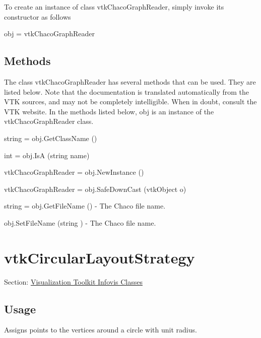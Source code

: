 To create an instance of class vtk\-Chaco\-Graph\-Reader, simply invoke its constructor as follows \begin{DoxyVerb}  obj = vtkChacoGraphReader
\end{DoxyVerb}
 \hypertarget{vtkwidgets_vtkxyplotwidget_Methods}{}\subsection{Methods}\label{vtkwidgets_vtkxyplotwidget_Methods}
The class vtk\-Chaco\-Graph\-Reader has several methods that can be used. They are listed below. Note that the documentation is translated automatically from the V\-T\-K sources, and may not be completely intelligible. When in doubt, consult the V\-T\-K website. In the methods listed below, {\ttfamily obj} is an instance of the vtk\-Chaco\-Graph\-Reader class. 
\begin{DoxyItemize}
\item {\ttfamily string = obj.\-Get\-Class\-Name ()}  
\item {\ttfamily int = obj.\-Is\-A (string name)}  
\item {\ttfamily vtk\-Chaco\-Graph\-Reader = obj.\-New\-Instance ()}  
\item {\ttfamily vtk\-Chaco\-Graph\-Reader = obj.\-Safe\-Down\-Cast (vtk\-Object o)}  
\item {\ttfamily string = obj.\-Get\-File\-Name ()} -\/ The Chaco file name.  
\item {\ttfamily obj.\-Set\-File\-Name (string )} -\/ The Chaco file name.  
\end{DoxyItemize}\hypertarget{vtkinfovis_vtkcircularlayoutstrategy}{}\section{vtk\-Circular\-Layout\-Strategy}\label{vtkinfovis_vtkcircularlayoutstrategy}
Section\-: \hyperlink{sec_vtkinfovis}{Visualization Toolkit Infovis Classes} \hypertarget{vtkwidgets_vtkxyplotwidget_Usage}{}\subsection{Usage}\label{vtkwidgets_vtkxyplotwidget_Usage}
Assigns points to the vertices around a circle with unit radius.

